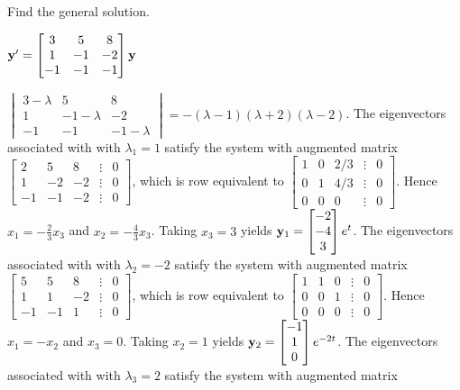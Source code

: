 \documentclass{ximera}
\begin{document}
\begin{problem}\label{exer:10.4.10}
Find the general solution.

$ {\bf y}'=
\begin{bmatrix}3&5&8\\1&-1&
-2\\-1&-1&-1\end{bmatrix}{\bf y}$

\begin{solution}
    $ \begin{vmatrix}3-\lambda&5&8\\1&-1-\lambda&-2\\
-1&-1&-1-\lambda\end{vmatrix}=-(\lambda-1)(\lambda+2)(\lambda-2)$.
The eigenvectors associated with
 with $\lambda_1=1$ satisfy the system with  augmented matrix
$ \begin{bmatrix}2&5&8&\vdots&0\\1&-2
&-2&\vdots&0\\-1&-1&-2&\vdots&0
\end{bmatrix}$,
which is row equivalent to
$ \begin{bmatrix}1&0&2/3&\vdots&0\\0&1&4/3&
\vdots&0\\0&0&0&\vdots&0\end{bmatrix}$.
Hence $x_1=-\frac{2 }{3}x_3$ and $x_2=-\frac{4 }{3}x_3$.  Taking $x_3=3$
yields
${\bf y}_1= \begin{bmatrix}-2\\-4\\3
\end{bmatrix}e^t$.
The eigenvectors associated with
 with $\lambda_2=-2$ satisfy the system with  augmented matrix
$ \begin{bmatrix}5&5&8&\vdots&0\\1&1
&-2&\vdots&0\\-1&-1&1&\vdots&0
\end{bmatrix}$,
which is row equivalent to
$ \begin{bmatrix}1&1&0&\vdots&0\\0&0&1&
\vdots&0\\0&0&0&\vdots&0\end{bmatrix}$.
Hence $x_1=-x_2$ and $x_3=0$.  Taking $x_2=1$ yields
${\bf y}_2= \begin{bmatrix} -1\\1\\0
\end{bmatrix}e^{-2t}$.
The eigenvectors associated with
 with $\lambda_3=2$ satisfy the system with  augmented matrix

\end{solution}
\end{problem}
\end{document}
